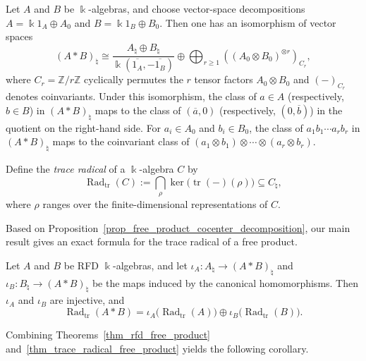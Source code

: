 \begin{proposition}\label{prop_free_product_cocenter_decomposition}
    Let \(A\) and \(B\) be \(\Bbbk\)-algebras, and choose vector-space decompositions \(A=\Bbbk1_A\oplus A_0\) and \(B=\Bbbk1_B\oplus B_0\). Then one has an isomorphism of vector spaces
    \begin{equation}\label{f_free_product_cocenter_decomposition}
        (A*B)_{\natural}
        \cong
        \frac{A_{\natural}\oplus B_{\natural}}
        {\Bbbk(\overline{1_A},-\overline{1_B})}
        \oplus
        \bigoplus_{r\geq1}
        \left((A_0\otimes B_0)^{\otimes r}\right)_{C_r},
    \end{equation}
    where \(C_r=\mathbb{Z}/r\mathbb{Z}\) cyclically permutes the \(r\) tensor factors \(A_0\otimes B_0\) and \((-)_{C_r}\) denotes coinvariants. Under this isomorphism, the class of \(a\in A\) (respectively, \(b\in B\)) in \((A*B)_{\natural}\) maps to the class of \((\overline a,0)\) (respectively, \((0,\overline b)\)) in the quotient on the right-hand side. For \(a_i\in A_0\) and \(b_i\in B_0\), the class of \(a_1b_1\cdots a_rb_r\) in \((A*B)_{\natural}\) maps to the coinvariant class of \((a_1\otimes b_1)\otimes\cdots\otimes(a_r\otimes b_r)\).
\end{proposition}

Define the \emph{trace radical} of a \(\Bbbk\)-algebra \(C\) by
\[
    \operatorname{Rad}_{\mathrm{tr}}(C):=
    \bigcap_{\rho}
    \ker\bigl(\operatorname{tr}(-)(\rho)\bigr)
    \subseteq C_{\natural},
\]
where \(\rho\) ranges over the finite-dimensional representations of \(C\).

Based on Proposition~\ref{prop_free_product_cocenter_decomposition}, our main result gives an exact formula for the trace radical of a free product.

\begin{theorem}\label{thm_trace_radical_free_product}
    Let \(A\) and \(B\) be RFD \(\Bbbk\)-algebras, and let \(\iota_A\colon A_{\natural}\to(A*B)_{\natural}\) and \(\iota_B\colon B_{\natural}\to(A*B)_{\natural}\) be the maps induced by the canonical homomorphisms. Then \(\iota_A\) and \(\iota_B\) are injective, and
    \[
        \operatorname{Rad}_{\mathrm{tr}}(A*B)
        =\iota_A\bigl(\operatorname{Rad}_{\mathrm{tr}}(A)\bigr)
        \oplus\iota_B\bigl(\operatorname{Rad}_{\mathrm{tr}}(B)\bigr).
    \]
\end{theorem}

Combining Theorems~\ref{thm_rfd_free_product} and~\ref{thm_trace_radical_free_product} yields the following corollary.

